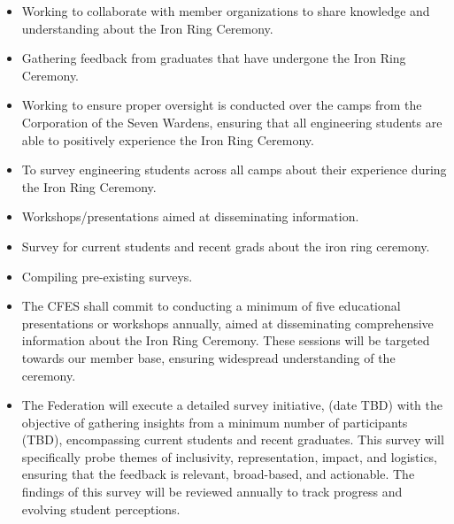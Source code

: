 \begin{itemize}
 \item Working to collaborate with member organizations to share knowledge and understanding about the Iron Ring Ceremony.
 \item Gathering feedback from graduates that have undergone the Iron Ring Ceremony.
\end{itemize}

\begin{itemize}
 \item Working to ensure proper oversight is conducted over the camps from the Corporation of the Seven Wardens, ensuring that all engineering students are able to positively experience the Iron Ring Ceremony.
 \item To survey engineering students across all camps about their experience during the Iron Ring Ceremony.
 \item Workshops/presentations aimed at disseminating information.
 \item Survey for current students and recent grads about the iron ring ceremony.
 \item Compiling pre-existing surveys.
 \item The CFES shall commit to conducting a minimum of five educational presentations or workshops annually, aimed at disseminating comprehensive information about the Iron Ring Ceremony. These sessions will be targeted towards our member base, ensuring widespread understanding of the ceremony.
 \item The Federation will execute a detailed survey initiative, (date TBD) with the objective of gathering insights from a minimum number of participants (TBD), encompassing current students and recent graduates. This survey will specifically probe themes of inclusivity, representation, impact, and logistics, ensuring that the feedback is relevant, broad-based, and actionable. The findings of this survey will be reviewed annually to track progress and evolving student perceptions.
\end{itemize}

\newpage
